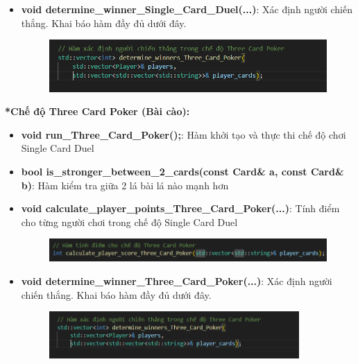 \documentclass{article}
\begin{document}
\begin{itemize}
    \item \textbf{void determine\_winner\_Single\_Card\_Duel(...)}: Xác định người chiến thắng. Khai báo hàm đầy đủ dưới đây.
    \begin{figure}[h!]
        \centering
        \includegraphics[width=1\textwidth]{images/screenshot/det_win_tcp.png}
    \end{figure}
\end{itemize}

\vspace{1cm}
\textbf{\fontsize{17pt}{0pt} *Chế độ Three Card Poker (Bài cào):}
\begin{itemize}
    \item \textbf{void run\_Three\_Card\_Poker();}: Hàm khởi tạo và thực thi chế độ chơi Single Card Duel

    \item \textbf{bool is\_stronger\_between\_2\_cards(const Card\& a, const Card\& b)}: Hàm kiểm tra giữa 2 lá bài lá nào mạnh hơn

    \item \textbf{void calculate\_player\_points\_Three\_Card\_Poker(...)}: Tính điểm cho từng người chơi trong chế độ Single Card Duel
    \begin{figure}[h!]
        \centering
        \includegraphics[width=1\textwidth]{images/screenshot/calc_player_tcp.png}
    \end{figure}

    \item \textbf{void determine\_winner\_Three\_Card\_Poker(...)}: Xác định người chiến thắng. Khai báo hàm đầy đủ dưới đây.
    \begin{figure}[h!]
        \centering
        \includegraphics[width=0.9\textwidth]{images/screenshot/det_win_tcp.png}
    \end{figure}
\end{itemize}
\end{document}
